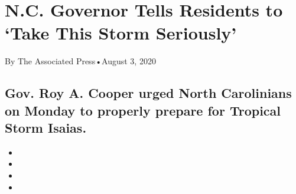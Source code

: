 \hypertarget{nc-governor-tells-residents-to-take-this-storm-seriously-1}{%
\section{N.C. Governor Tells Residents to `Take This Storm
Seriously'}\label{nc-governor-tells-residents-to-take-this-storm-seriously-1}}

By The Associated Press•August 3, 2020

\hypertarget{gov-roy-a-cooper-urged-north-carolinians-on-monday-to-properly-prepare-for-tropical-storm-isaias-1}{%
\subsection{Gov. Roy A. Cooper urged North Carolinians on Monday to
properly prepare for Tropical Storm
Isaias.}\label{gov-roy-a-cooper-urged-north-carolinians-on-monday-to-properly-prepare-for-tropical-storm-isaias-1}}

\begin{itemize}
\item
\item
\item
\item
\end{itemize}

